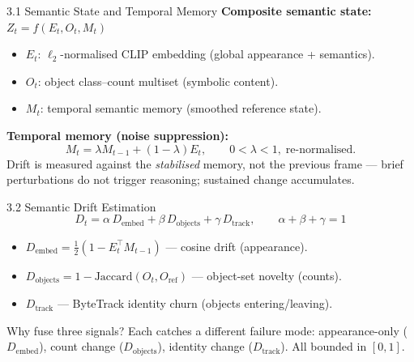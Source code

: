 \documentclass[11pt,aspectratio=169]{beamer}
\begin{document}
\begin{frame}{3.1 Semantic State and Temporal Memory}
\textbf{Composite semantic state:}\quad $Z_t = f(E_t, O_t, M_t)$
\begin{itemize}\footnotesize
  \item $E_t$: $\ell_2$-normalised CLIP embedding (global appearance + semantics).
  \item $O_t$: object class--count multiset (symbolic content).
  \item $M_t$: temporal semantic memory (smoothed reference state).
\end{itemize}
\textbf{Temporal memory (noise suppression):}
\[
M_t = \lambda M_{t-1} + (1-\lambda)E_t,\qquad 0<\lambda<1,\;\text{re-normalised.}
\]
\centering\footnotesize Drift is measured against the \emph{stabilised} memory, not the previous frame --- brief perturbations do not trigger reasoning; sustained change accumulates.
\end{frame}

\begin{frame}{3.2 Semantic Drift Estimation}
\[
D_t = \alpha\,D_{\text{embed}} + \beta\,D_{\text{objects}} + \gamma\,D_{\text{track}},
\qquad \alpha+\beta+\gamma = 1
\]
\begin{itemize}\footnotesize
  \item $D_{\text{embed}} = \tfrac12(1 - E_t^{\!\top}M_{t-1})$ --- cosine drift (appearance).
  \item $D_{\text{objects}} = 1-\text{Jaccard}(O_t,O_{\text{ref}})$ --- object-set novelty (counts).
  \item $D_{\text{track}}$ --- ByteTrack identity churn (objects entering/leaving).
\end{itemize}
\begin{block}{Why fuse three signals?}
Each catches a different failure mode: appearance-only ($D_{\text{embed}}$), count change ($D_{\text{objects}}$), identity change ($D_{\text{track}}$). All bounded in $[0,1]$.
\end{block}
\end{frame}
\end{document}
